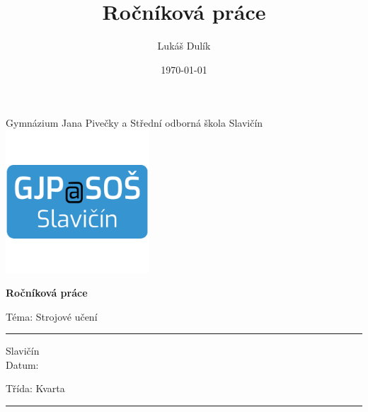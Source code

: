 \documentclass[a4paper,11pt, oneside]{book} \usepackage[czech]{babel}
\title{Ročníková práce} \author{Lukáš Dulík} \date{\today} %
\begin{document}

	\begin{titlepage} \begin{center} \vspace*{1cm}

			\Huge Gymnázium Jana Pivečky a Střední odborná škola Slavičín \\

			\includegraphics[width=0.4\textwidth]{img/gjp.png}

			\textbf{Ročníková práce}

			\vspace{0.5cm} \LARGE Téma: Strojové učení \end{center}

		\vspace{1.5cm}

		\vfill

		\vspace{0.8cm}

		\vspace{5pt}
		\hrule \vspace{6pt}

		\Large

		\makeatletter \begin{multicols}{2} \noindent Slavičín \\ Datum: \@date

		\columnbreak \noindent \null\hfill Třída: Kvarta \\ \null\hfill \@author
	\end{multicols}

		\makeatother

		\vspace{5pt}

		\hrule

	\end{titlepage}

	\newpage
		\mbox{}
	\newpage
\end{document}
